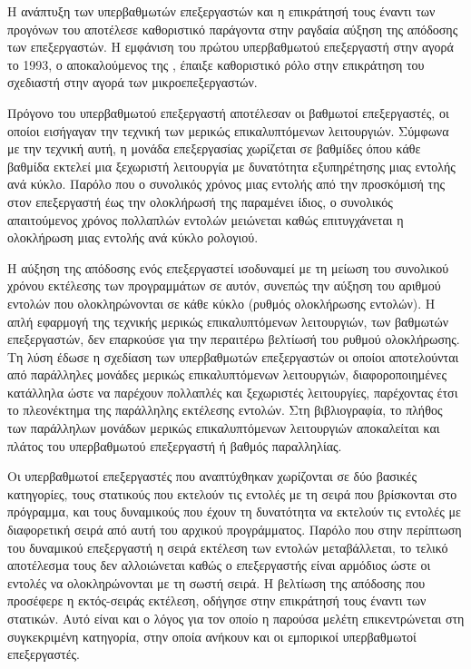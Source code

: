 Η ανάπτυξη των υπερβαθμωτών επεξεργαστών και η επικράτησή τους έναντι των προγόνων του αποτέλεσε καθοριστικό παράγοντα στην ραγδαία αύξηση της απόδοσης των επεξεργαστών. Η εμφάνιση του πρώτου υπερβαθμωτού επεξεργαστή στην αγορά το 1993, ο αποκαλούμενος  της  \cite{saini1993design}, έπαιξε καθοριστικό ρόλο στην επικράτηση του σχεδιαστή στην αγορά των μικροεπεξεργαστών.
\par
Πρόγονο του υπερβαθμωτού επεξεργαστή αποτέλεσαν οι βαθμωτοί επεξεργαστές, οι οποίοι εισήγαγαν την τεχνική των μερικώς επικαλυπτόμενων λειτουργιών. Σύμφωνα με την τεχνική αυτή, η μονάδα επεξεργασίας χωρίζεται σε βαθμίδες όπου κάθε βαθμίδα εκτελεί μια ξεχωριστή λειτουργία με δυνατότητα εξυπηρέτησης μιας εντολής ανά κύκλο. Παρόλο που ο συνολικός χρόνος μιας εντολής από την προσκόμισή της στον επεξεργαστή έως την ολοκλήρωσή της παραμένει ίδιος, ο συνολικός απαιτούμενος χρόνος  πολλαπλών εντολών μειώνεται καθώς επιτυγχάνεται η ολοκλήρωση μιας εντολής ανά κύκλο ρολογιού.
\par
Η αύξηση της απόδοσης ενός επεξεργαστεί ισοδυναμεί με τη μείωση του συνολικού χρόνου εκτέλεσης των προγραμμάτων σε αυτόν, συνεπώς την αύξηση του αριθμού εντολών που ολοκληρώνονται σε κάθε κύκλο (ρυθμός ολοκλήρωσης εντολών). Η απλή εφαρμογή της τεχνικής μερικώς επικαλυπτόμενων λειτουργιών, των βαθμωτών επεξεργαστών, δεν επαρκούσε για την περαιτέρω βελτίωσή του ρυθμού ολοκλήρωσης. Τη λύση έδωσε η σχεδίαση των υπερβαθμωτών επεξεργαστών οι οποίοι αποτελούνται από παράλληλες μονάδες μερικώς επικαλυπτόμενων λειτουργιών, διαφοροποιημένες κατάλληλα ώστε να παρέχουν πολλαπλές και ξεχωριστές λειτουργίες, παρέχοντας έτσι το πλεονέκτημα της παράλληλης εκτέλεσης εντολών. Στη βιβλιογραφία, το πλήθος των παράλληλων μονάδων μερικώς επικαλυπτόμενων λειτουργιών αποκαλείται και πλάτος του υπερβαθμωτού επεξεργαστή ή βαθμός παραλληλίας.
\par
Οι υπερβαθμωτοί επεξεργαστές που αναπτύχθηκαν χωρίζονται σε δύο βασικές κατηγορίες, τους στατικούς που εκτελούν τις εντολές με τη σειρά που βρίσκονται στο πρόγραμμα, και τους δυναμικούς που έχουν τη δυνατότητα να εκτελούν τις εντολές με διαφορετική σειρά από αυτή του αρχικού προγράμματος. Παρόλο που στην περίπτωση του δυναμικού επεξεργαστή η σειρά εκτέλεση των εντολών μεταβάλλεται, το τελικό αποτέλεσμα τους δεν αλλοιώνεται καθώς ο επεξεργαστής είναι αρμόδιος ώστε οι εντολές να ολοκληρώνονται με τη σωστή σειρά. Η βελτίωση της απόδοσης που προσέφερε η εκτός-σειράς εκτέλεση, οδήγησε στην επικράτησή τους έναντι των στατικών. Αυτό είναι και ο λόγος για τον οποίο η παρούσα μελέτη επικεντρώνεται στη συγκεκριμένη κατηγορία, στην οποία ανήκουν και οι εμπορικοί υπερβαθμωτοί επεξεργαστές.

